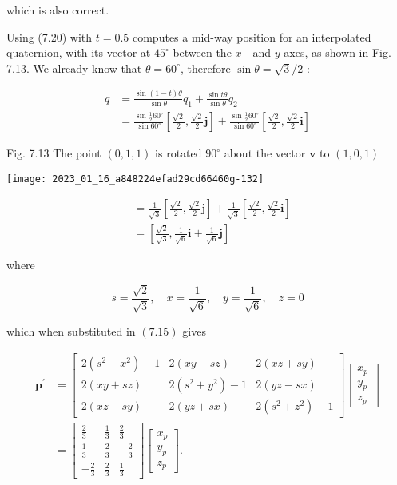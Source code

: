 which is also correct.

Using (7.20) with $t=0.5$ computes a mid-way position for an interpolated quaternion, with its vector at $45^{\circ}$ between the $x$ - and $y$-axes, as shown in Fig. 7.13. We already know that $\theta=60^{\circ}$, therefore $\sin \theta=\sqrt{3} / 2$ :

$$
\begin{aligned}
q & =\frac{\sin (1-t) \theta}{\sin \theta} q_{1}+\frac{\sin t \theta}{\sin \theta} q_{2} \\
& =\frac{\sin \frac{1}{2} 60^{\circ}}{\sin 60^{\circ}}\left[\frac{\sqrt{2}}{2}, \frac{\sqrt{2}}{2} \mathbf{j}\right]+\frac{\sin \frac{1}{2} 60^{\circ}}{\sin 60^{\circ}}\left[\frac{\sqrt{2}}{2}, \frac{\sqrt{2}}{2} \mathbf{i}\right]
\end{aligned}
$$

Fig. 7.13 The point $(0,1,1)$ is rotated $90^{\circ}$ about the vector $\mathbf{v}$ to $(1,0,1)$

\begin{center}
\texttt{[image: 2023\_01\_16\_a848224efad29cd66460g-132]}
\end{center}

$$
\begin{aligned}
& =\frac{1}{\sqrt{3}}\left[\frac{\sqrt{2}}{2}, \frac{\sqrt{2}}{2} \mathbf{j}\right]+\frac{1}{\sqrt{3}}\left[\frac{\sqrt{2}}{2}, \frac{\sqrt{2}}{2} \mathbf{i}\right] \\
& =\left[\frac{\sqrt{2}}{\sqrt{3}}, \frac{1}{\sqrt{6}} \mathbf{i}+\frac{1}{\sqrt{6}} \mathbf{j}\right]
\end{aligned}
$$

where

$$
s=\frac{\sqrt{2}}{\sqrt{3}}, \quad x=\frac{1}{\sqrt{6}}, \quad y=\frac{1}{\sqrt{6}}, \quad z=0
$$

which when substituted in $(7.15)$ gives

$$
\begin{aligned}
\mathbf{p}^{\prime} & =\left[\begin{array}{ccc}
2\left(s^{2}+x^{2}\right)-1 & 2(x y-s z) & 2(x z+s y) \\
2(x y+s z) & 2\left(s^{2}+y^{2}\right)-1 & 2(y z-s x) \\
2(x z-s y) & 2(y z+s x) & 2\left(s^{2}+z^{2}\right)-1
\end{array}\right]\left[\begin{array}{l}
x_{p} \\
y_{p} \\
z_{p}
\end{array}\right] \\
& =\left[\begin{array}{ccc}
\frac{2}{3} & \frac{1}{3} & \frac{2}{3} \\
\frac{1}{3} & \frac{2}{3} & -\frac{2}{3} \\
-\frac{2}{3} & \frac{2}{3} & \frac{1}{3}
\end{array}\right]\left[\begin{array}{l}
x_{p} \\
y_{p} \\
z_{p}
\end{array}\right] .
\end{aligned}
$$

